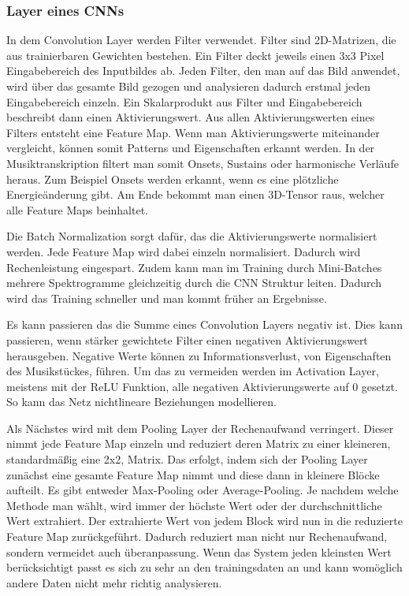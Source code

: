 \subsubsection{Layer eines CNNs}
In dem Convolution Layer werden Filter verwendet.
Filter sind 2D-Matrizen, die aus trainierbaren Gewichten bestehen.
Ein Filter deckt jeweils einen 3x3 Pixel Eingabebereich des Inputbildes ab.
Jeden Filter, den man auf das Bild anwendet,
wird über das gesamte Bild gezogen und analysieren dadurch erstmal jeden Eingabebereich einzeln.
Ein Skalarprodukt aus Filter und Eingabebereich beschreibt dann einen Aktivierungswert.
Aus allen Aktivierungswerten eines Filters entsteht eine Feature Map.
Wenn man Aktivierungswerte miteinander vergleicht,
können somit Patterns und Eigenschaften erkannt werden.
In der Musiktranskription filtert man somit Onsets, Sustains oder harmonische Verläufe heraus.
Zum Beispiel Onsets werden erkannt, wenn es eine plötzliche Energieänderung gibt.
Am Ende bekommt man einen 3D-Tensor raus, welcher alle Feature Maps beinhaltet.

Die Batch Normalization sorgt dafür, das die Aktivierungswerte normalisiert werden.
Jede Feature Map wird dabei einzeln normalisiert.
Dadurch wird Rechenleistung eingespart.
Zudem kann man im Training durch Mini-Batches mehrere Spektrogramme gleichzeitig durch die CNN Struktur leiten.
Dadurch wird das Training schneller und man kommt früher an Ergebnisse.

Es kann passieren das die Summe eines Convolution Layers negativ ist.
Dies kann passieren, wenn stärker gewichtete Filter einen negativen Aktivierungswert herausgeben.
Negative Werte können zu Informationsverlust, von Eigenschaften des Musikstückes, führen.
Um das zu vermeiden werden im Activation Layer, meistens mit der ReLU Funktion,
alle negativen Aktivierungswerte auf 0 gesetzt.
So kann das Netz nichtlineare Beziehungen modellieren.

Als Nächstes wird mit dem Pooling Layer der Rechenaufwand verringert.
Dieser nimmt jede Feature Map einzeln und reduziert deren Matrix zu einer kleineren, standardmäßig eine 2x2, Matrix.
Das erfolgt, indem sich der Pooling Layer zunächst eine
gesamte Feature Map nimmt und diese dann in kleinere Blöcke aufteilt.
Es gibt entweder Max-Pooling oder Average-Pooling.
Je nachdem welche Methode man wählt, wird immer der höchste Wert oder der durchschnittliche Wert extrahiert.
Der extrahierte Wert von jedem Block wird nun in die reduzierte Feature Map zurückgeführt.
Dadurch reduziert man nicht nur Rechenaufwand, sondern vermeidet auch überanpassung.
Wenn das System jeden kleinsten Wert berücksichtigt passt es sich zu sehr an den trainingsdaten an
und kann womöglich andere Daten nicht mehr richtig analysieren.

